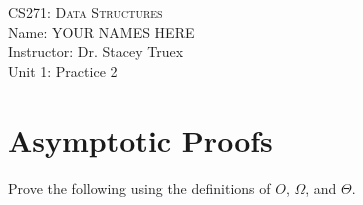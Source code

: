 \documentclass[11pt, letter]{article}
\begin{document}
\begin{center}
{\Large \textsc{CS271: Data Structures}}\vspace{\baselineskip}\\

Name: YOUR NAMES HERE\vspace{\baselineskip}\\
Instructor: Dr. Stacey Truex
\vspace{\baselineskip}\\
\Large{Unit 1: Practice 2}
\end{center}

\section*{Asymptotic Proofs}

Prove the following using the definitions of $O$, $\Omega$, and $\Theta$.
    
\end{document}
